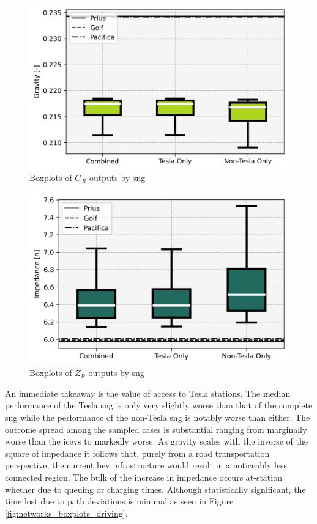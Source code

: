 \begin{multicols}{2}
\begin{figure}[H]
	\centering
	\includegraphics[width = \linewidth]{figs/Networks_Boxplots_Gravity.png}
	\caption{Boxplots of $G_R$ outputs by \gls{sng}}
	\label{fig:networks_boxplots_gravity}
\end{figure}

\begin{figure}[H]
	\centering
	\includegraphics[width = \linewidth]{figs/Networks_Boxplots_Impedance.png}
	\caption{Boxplots of $Z_R$ outputs by \gls{sng}}
	\label{fig:networks_boxplots_impedance}
\end{figure}

An immediate takeaway is the value of access to Tesla stations. The median performance of the Tesla \gls{sng} is only very slightly worse than that of the complete \gls{sng} while the performance of the non-Tesla \gls{sng} is notably worse than either. The outcome spread among the sampled cases is substantial ranging from marginally worse than the \glspl{icev} to markedly worse. As gravity scales with the inverse of the square of impedance it follows that, purely from a road transportation perspective, the current \gls{bev} infrastructure would result in a noticeably less connected region. The bulk of the increase in impedance occurs at-station whether due to queuing or charging times. Although statistically significant, the time lost due to path deviations is minimal as seen in Figure \ref{fig:networks_boxplots_driving}.


\end{multicols}
